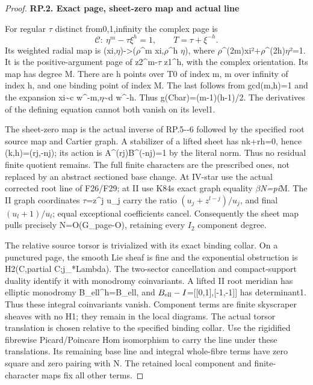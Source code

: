 \begin{proof}
\par

\medskip\noindent\textbf{RP.2. Exact page, sheet-zero map and actual line}

\par\nobreak

For regular \(\tau\) distinct from0,1,infinity the complex page is
\[
\mathcal C:\ \eta^m-\tau\xi^h=1,\qquad
T=\tau+\xi^{-h}.
\tag{RP.7}
\]
Its weighted radial map is (xi,\(\eta\))-\textgreater(\(\rho\)\^{}m xi,\(\rho\)\^{}h \(\eta\)),
where \(\rho\)\^{}(2m)\textbar xi\textbar²+\(\rho\)\^{}(2h)\textbar{}\(\eta\)\textbar²=1. It is the positive-argument
page of z2\^{}m-\(\tau\) z1\^{}h, with the complex orientation. Its map has
degree M. There are h points over T0 of index m, m over infinity
of index h, and one binding point of index M. The last follows
from gcd(m,h)=1 and the expansion xi\textasciitilde c w\^{}-m,\(\eta\)\textasciitilde d w\^{}-h. Thus
g(Cbar)=(m-1)(h-1)/2. The derivatives of the defining equation cannot
both vanish on its level1.

The sheet-zero map is the actual inverse of RP.5-\/-6 followed by the
specified root source map and Cartier graph. A stabilizer of a lifted
sheet has nk+rh=0, hence (k,h)=(rj,-nj); its action is A\^{}(rj)B\^{}(-nj)=1
by the literal norm. Thus no residual finite quotient remains. The
full finite characters are the prescribed ones, not replaced by an
abstract sectioned base change. At IV-star use the actual corrected
root line of F26/F29; at II use K84\textquotesingle s exact graph equality \(\beta\)\emph{N=pi}M.
The II graph coordinates \(\tau\)\textquotesingle=z\^{}j u\_j carry the ratio
\((u_j+z^{l-j})/u_j\), and final \((u_l+1)/u_l\); equal exceptional
coefficients cancel. Consequently the sheet map pulls precisely
N=O(G\_page-O), retaining every \(I_2\) component degree.

The relative source torsor is trivialized with its exact binding collar.
On a punctured page, the smooth Lie sheaf is fine and the exponential
obstruction is H2(C,partial C;j\_*Lambda). The two-sector cancellation
and compact-support duality identify it with monodromy coinvariants.
A lifted II root meridian has elliptic monodromy B\_ell\^{}h=B\_ell,
and \(B_{\rm ell}-I\)={[}{[}0,1{]},{[}-1,-1{]}{]} has determinant1. Thus these integral
coinvariants vanish. Component terms are finite skyscraper sheaves
with no H1; they remain in the local diagrams. The actual torsor
translation is chosen relative to the specified binding collar.
Use the rigidified fibrewise Picard/Poincare Hom isomorphism to carry
the line under these translations. Its remaining base line and integral
whole-fibre terms have zero square and zero pairing with N. The
retained local component and finite-character maps fix all other terms.


\end{proof}
